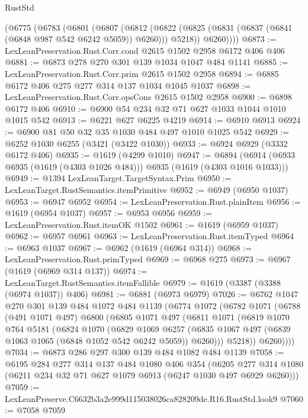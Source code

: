 \begin{lexlean}{RustStd}
\begin{coremodule}
    (@6775
      (@6783
        (@6801
          (@6807
            (@6812
              (@6822 (@6825 (@6831 (@6837 (@6841 (@6848 @987 @542 @6242 @5059)) @6260))) @5218))
            @6260))))
@6873 := LexLeanPreservation.Rust.Corr.cond @2615 @1502 @2958 @6172 @406 @406
@6881 := @6873 @278 @270 @301 @139 @1034 @1047 @484 @1141
@6885 := LexLeanPreservation.Rust.Corr.prim @2615 @1502 @2958
@6894 := @6885 @6172 @406 @275 @277 @314 @137 @1034 @1045 @1037
@6898 := LexLeanPreservation.Rust.Corr.opsCons @2615 @1502 @2958
@6900 := @6898 @6172 @406
@6910 := @6900 @54 @234 @32 @71 @627 @1033 @1044 @1010 @1015 @542
@6913 := @6221 @627 @6225 @4219
@6914 := @6910 @6913
@6924 := @6900 @81 @50 @32 @35 @1030 @484 @497 @1010 @1025 @542
@6929 := @6252 @1030 @6255 (@3421 (@3422 @1030))
@6933 := @6924 @6929 (@3332 @6172 @406)
@6935 := @1619 (@4299 @1010)
@6947 := @6894 (@6914 (@6933 @6935 (@1619 (@4303 @1026 @484))) @6935 (@1619 (@4303 @1016 @1033)))
@6949 := @1394 LexLeanTarget.TargetSyntax.Prim
@6950 := LexLeanTarget.RustSemantics.itemPrimitive
@6952 := @6949 (@6950 @1037)
@6953 := @6947 @6952
@6954 := LexLeanPreservation.Rust.plainItem
@6956 := @1619 (@6954 @1037)
@6957 := @6953 @6956
@6959 := LexLeanPreservation.Rust.itemOK @1502
@6961 := @1619 (@6959 @1037)
@6962 := @6957 @6961
@6963 := LexLeanPreservation.Rust.itemTyped
@6964 := @6963 @1037
@6967 := @6962 (@1619 (@6964 @314))
@6968 := LexLeanPreservation.Rust.primTyped
@6969 := @6968 @275
@6973 := @6967 (@1619 (@6969 @314 @137))
@6974 := LexLeanTarget.RustSemantics.itemFallible
@6979 := @1619 (@3387 (@3388 (@6974 @1037)) @406)
@6981 := @6881 (@6973 @6979)
@7026 := @6762
    @1047
    @270
    @301
    @139
    @484
    @1072
    @484
    @1139
    (@6774
      @1072
      (@6782
        @1071
        (@6788
          (@491 @1071 @497)
          @6800
          (@6805
            @1071
            @497
            (@6811
              @1071
              (@6819
                @1070
                @764
                @5181
                (@6824
                  @1070
                  (@6829
                    @1069
                    @6257
                    (@6835 @1067 @497 (@6839 @1063 @1065 (@6848 @1052 @542 @6242 @5059)) @6260)))
                @5218))
            @6260))))
@7034 := @6873 @286 @297 @300 @139 @484 @1082 @484 @1139
@7058 := @6195
    @284
    @277
    @314
    @137
    @484
    @1080
    @406
    @354
    (@6205 @277 @314 @1080 (@6211 @234 @32 @71 @627 @1079 @6913 (@6247 @1030 @497 @6929 @6260)))
@7059 := LexLeanPreserve.C6632b3a2e999d115038026ca828209de.R16.RustStd.look9
@7060 := @7058 @7059

\end{coremodule}
\end{lexlean}
